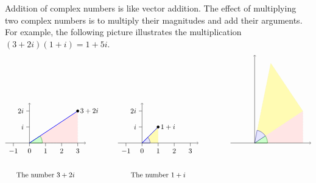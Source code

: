 Addition of complex numbers is like vector addition. The effect of
multiplying two complex numbers is to multiply their magnitudes and
add their arguments. For example, the following picture illustrates
the multiplication $(3+2i)(1+i)=1+5i$.
\begin{equation*}
  \begin{tikzpicture}[scale=0.8]
    \begin{scope}
      \draw[help lines, dotted, fill=red!10] (0,0) -- (3,0) -- (3,2) -- cycle;
      \filldraw[fill=green!20,draw=green!50!black] (0,0) -- (0.8,0) arc (0:33.69:0.8) -- cycle;
      \draw[->](-1.5,0) -- (3.5,0);
      \draw[->](0,0) -- (0,2.5);
      \draw(0,1) -- +(-0.2,0) node[left] {$i$};
      \draw(0,2) -- +(-0.2,0) node[left] {$2i$};
      \draw(-1,0) -- +(0,-0.2) node[below] {$-1$};
      \draw(0,0) -- +(0,-0.2) node[below] {$0$};
      \draw(1,0) -- +(0,-0.2) node[below] {$1$};
      \draw(2,0) -- +(0,-0.2) node[below] {$2$};
      \draw(3,0) -- +(0,-0.2) node[below] {$3$};
      \draw[thick, blue] (0,0) -- (3,2);
      \draw[fill, black] (3,2) circle [radius=2.25pt] node [right] {$3+2i$};
      \draw (1,-2) node {The number $3+2i$};
    \end{scope}
    \begin{scope}[xshift=7cm]
      \draw[help lines, dotted, fill=yellow!30] (0,0) -- (1,0) -- (1,1) -- cycle;
      \filldraw[fill=blue!10,draw=blue!50!black] (0,0) -- (0.5,0) arc (0:45:0.5) -- cycle;
      \draw[->](-1.5,0) -- (3.5,0);
      \draw[->](0,0) -- (0,2.5);
      \draw(0,1) -- +(-0.2,0) node[left] {$i$};
      \draw(0,2) -- +(-0.2,0) node[left] {$2i$};
      \draw(-1,0) -- +(0,-0.2) node[below] {$-1$};
      \draw(0,0) -- +(0,-0.2) node[below] {$0$};
      \draw(1,0) -- +(0,-0.2) node[below] {$1$};
      \draw(2,0) -- +(0,-0.2) node[below] {$2$};
      \draw(3,0) -- +(0,-0.2) node[below] {$3$};
      \draw[thick, blue] (0,0) -- (1,1);
      \draw[fill, black] (1,1) circle [radius=2.25pt] node [right] {$1+i$};
      \draw (1,-2) node {The number $1+i$};
    \end{scope}
    \begin{scope}[xshift=14cm]
      \draw[help lines, dotted, fill=red!10] (0,0) -- (3,0) -- (3,2) -- cycle;
      \draw[help lines, dotted, fill=yellow!30] (0,0) -- (3,2) -- (1,5) -- cycle;
      \filldraw[fill=green!20,draw=green!50!black] (0,0) -- (0.8,0) arc (0:33.69:0.8) -- cycle;
      \filldraw[fill=blue!10,draw=blue!50!black] (0,0) -- (33.69:0.8) arc (33:78.69:0.8) -- cycle;
      \draw[->](-1.5,0) -- (3.5,0);
      \draw[->](0,0) -- (0,5.5);

\end{scope}
\end{tikzpicture}
\end{equation*}
